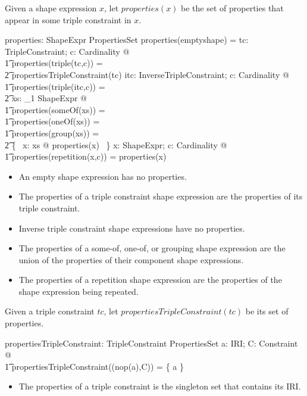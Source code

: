 \documentclass{article}
\begin{document}
Given a shape expression $x$, let $properties(x)$ be the set of properties that appear in some 
triple constraint in $x$.
\begin{axdef}
	properties: ShapeExpr \fun PropertiesSet
\where
	properties(emptyshape) = \emptyset
\also
	\forall tc: TripleConstraint; c: Cardinality @ \\
\t1		properties(triple(tc,c)) = \\
\t2			propertiesTripleConstraint(tc)
\also
	\forall itc: InverseTripleConstraint; c: Cardinality @ \\
\t1		properties(triple(itc,c)) = \\
\t2			\emptyset
\also
	\forall xs: \seq_1 ShapeExpr @ \\
\t1		properties(someOf(xs)) = \\
\t1		properties(oneOf(xs)) = \\
\t1		properties(group(xs)) = \\
\t2			\bigcup \{~ x: \ran xs @ properties(x) ~\}
\also
	\forall x: ShapeExpr; c: Cardinality @ \\
\t1		properties(repetition(x,c)) = properties(x)
\end{axdef}
\begin{itemize}
\item An empty shape expression has no properties.
\item The properties of a triple constraint shape expression are the properties of its triple constraint.
\item Inverse triple constraint shape expressions have no properties.
\item The properties of a some-of, one-of, or grouping shape expression are the union of the properties of their
component shape expressions.
\item The properties of a repetition shape expression are the properties of the shape expression being repeated.
\end{itemize}

Given a triple constraint $tc$, let $propertiesTripleConstraint(tc)$ be its set of properties.
\begin{axdef}
	propertiesTripleConstraint: TripleConstraint \fun PropertiesSet
\where
	\forall a: IRI; C: Constraint @ \\
\t1		propertiesTripleConstraint((nop(a),C)) = \{ a \}
\end{axdef}
\begin{itemize}
\item The properties of a triple constraint is the singleton set that contains its IRI.
\end{itemize}
\end{document}
